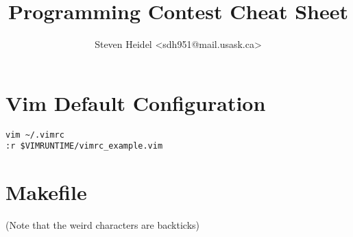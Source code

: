 \documentclass{article}
\begin{document}
\title{Programming Contest Cheat Sheet}
\author{Steven Heidel \textless sdh951@mail.usask.ca\textgreater}
\date{}

\maketitle

\section{Vim Default Configuration}

\begin{lstlisting}
vim ~/.vimrc
:r $VIMRUNTIME/vimrc_example.vim
\end{lstlisting}

\section{Makefile}



(Note that the weird characters are backticks)
\end{document}
